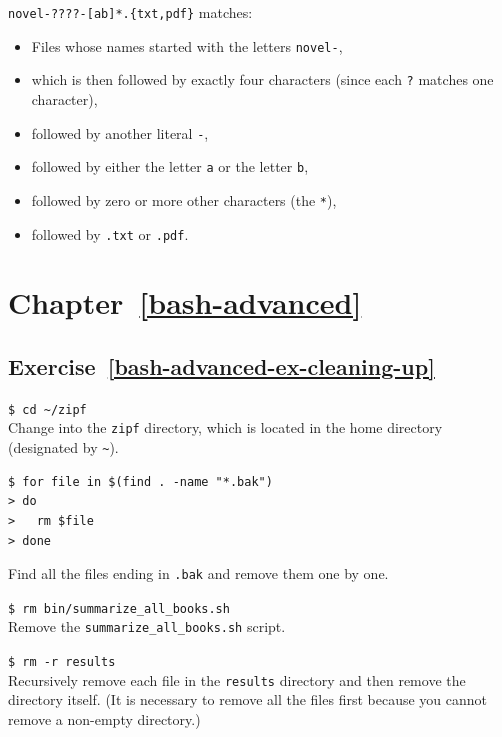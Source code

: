 \documentclass[
]{krantz}
\providecommand{\tightlist}{%
  \setlength{\itemsep}{0pt}\setlength{\parskip}{0pt}}
\begin{document}
\texttt{novel-????-{[}ab{]}*.\{txt,pdf\}} matches:

\begin{itemize}
\tightlist
\item
  Files whose names started with the letters \texttt{novel-},
\item
  which is then followed by exactly four characters
  (since each \texttt{?} matches one character),
\item
  followed by another literal \texttt{-},
\item
  followed by either the letter \texttt{a} or the letter \texttt{b},
\item
  followed by zero or more other characters (the \texttt{*}),
\item
  followed by \texttt{.txt} or \texttt{.pdf}.
\end{itemize}

\hypertarget{chapter-refbash-advanced}{%
\section*{Chapter~\ref{bash-advanced}}\label{chapter-refbash-advanced}}

\hypertarget{exercise-refbash-advanced-ex-cleaning-up}{%
\subsection*{Exercise~\ref{bash-advanced-ex-cleaning-up}}\label{exercise-refbash-advanced-ex-cleaning-up}}


\texttt{\$\ cd\ \textasciitilde{}/zipf}~\\
Change into the \texttt{zipf} directory,
which is located in the home directory (designated by \texttt{\textasciitilde{}}).

\begin{verbatim}
$ for file in $(find . -name "*.bak")
> do
>   rm $file
> done
\end{verbatim}

Find all the files ending in \texttt{.bak} and remove them one by one.

\texttt{\$\ rm\ bin/summarize\_all\_books.sh}~\\
Remove the \texttt{summarize\_all\_books.sh} script.

\texttt{\$\ rm\ -r\ results}~\\
Recursively remove each file in the \texttt{results} directory
and then remove the directory itself.
(It is necessary to remove all the files first because you
cannot remove a non-empty directory.)
\end{document}
